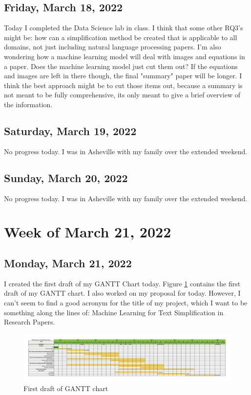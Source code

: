 \documentclass[11pt,letterpaper]{article}
\begin{document}
\subsection{Friday, March 18, 2022}
Today I completed the Data Science lab in class. I think that some other RQ3's might be: how can a simplification method be created that is applicable to all domains, not just including natural language processing papers. I'm also wondering how a machine learning model will deal with images and equations in a paper. Does the machine learning model just cut them out? If the equations and images are left in there though, the final "summary" paper will be longer. I think the best approach might be to cut those items out, because a summary is not meant to be fully comprehensive, its only meant to give a brief overview of the information.

\subsection{Saturday, March 19, 2022}
No progress today. I was in Asheville with my family over the extended weekend.

\subsection{Sunday, March 20, 2022}
No progress today. I was in Asheville with my family over the extended weekend.

\section{Week of March 21, 2022}
\subsection{Monday, March 21, 2022}
I created the first draft of my GANTT Chart today. Figure \ref{fig:gantt} contains the first draft of my GANTT chart. I also worked on my proposal for today. However, I can't seem to find a good acronym for the title of my project, which I want to be something along the lines of: Machine Learning for Text Simplification in Research Papers.

\begin{figure}
    \centering
    \includegraphics[scale=0.05]{images/RCompSci2022GANTTChart (1).png}
    \caption{First draft of GANTT chart}
    \label{fig:gantt}
\end{figure}
\end{document}
